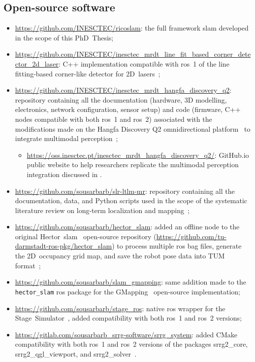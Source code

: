 \subsection{Open-source software}
\begin{itemize}[leftmargin=1cm,style=nextline,font=\normalfont]
\item \url{https://github.com/INESCTEC/ricoslam}:
the full framework \gls{slam} developed in the scope of this PhD~Thesis;
\item \url{https://github.com/INESCTEC/inesctec_mrdt_line_fit_based_corner_detector_2d_laser}:
C++ implementation compatible with \gls{ros}~1 of the
line fitting-based corner-like detector for 2D~lasers~\cite{sousa:icara:2024};
\item \url{https://github.com/INESCTEC/inesctec_mrdt_hangfa_discovery_q2}:
repository containing all the documentation
(hardware, 3D modelling, electronics, network configuration, sensor setup)
and code (firmware, C++ nodes compatible with both \gls{ros}~1 and \gls{ros}~2)
associated with the modifications made on the
Hangfa Discovery Q2 omnidirectional platform~\cite{amr:hangfa-q2}
to integrate multimodal perception~\cite{sousa:icarsc:2025};
  \begin{itemize}[style=nextline,font=\normalfont]
  \item \url{https://oss.inesctec.pt/inesctec_mrdt_hangfa_discovery_q2/}:
  GitHub.io public website to help researchers replicate the multimodal
  perception integration discussed in \cite{sousa:icarsc:2025}.
  \end{itemize}
\item \url{https://github.com/sousarbarb/slr-ltlm-mr}:
repository containing all the documentation, data, and Python scripts used in
the scope of the systematic literature review on long-term localization and
mapping~\cite{sousa:jfr:2023};
\item \url{https://github.com/sousarbarb/hector_slam}:
added an offline node to the original
Hector~\gls{slam}~\cite{kohlbrecher:ssr:2011} open-source repository
(\url{https://github.com/tu-darmstadt-ros-pkg/hector_slam})
to process multiple \gls{ros} bag files,
generate the 2D~occupancy grid map,
and save the robot pose data into TUM format~\cite{sturm:iros:2012};
\item \url{https://github.com/sousarbarb/slam_gmapping}:
same addition made to the \texttt{hector\_slam} \gls{ros} package
for the GMapping~\cite{grisetti:tro:2007} open-source implementation;
\item \url{https://github.com/sousarbarb/stage_ros}:
native \gls{ros} wrapper for the
Stage~Simulator~\cite{gerkey:iros:2001,vaughan:si:2008,stage},
added compatibility with both \gls{ros}~1 and \gls{ros}~2 versions;
\item \url{https://gitlab.com/sousarbarb_srrg-software/srrg_system}:
added CMake compatibility with both \gls{ros}~1 and \gls{ros}~2 versions
of the packages srrg2\_core, srrg2\_qgl\_viewport,
and srrg2\_solver~\cite{grisetti:robotics:2020}.
\end{itemize}

